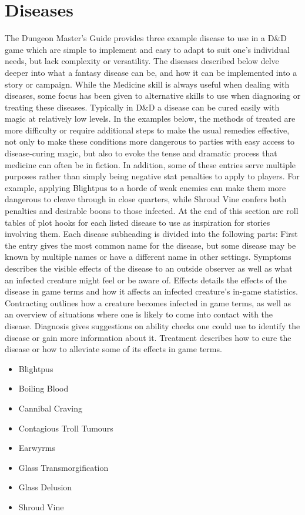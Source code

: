 \documentclass[10pt,a4paper,twoside,twocolumn,openany,bg=print,nodeprecatedcode]{dndbook}
\begin{document}
\tableofcontents
\newpage
\chapter{Diseases}
The Dungeon Master's Guide provides three example disease to use in a D\&D game which are simple to implement and easy to adapt to suit one's individual needs, but lack complexity or versatility. The diseases described below delve deeper into what a fantasy disease can be, and how it can be implemented into a story or campaign.
While the Medicine skill is always useful when dealing with diseases, some focus has been given to alternative skills to use when diagnosing or treating these diseases. Typically in D\&D a disease can be cured easily with magic at relatively low levels. In the examples below, the methods of treated are more difficulty or require additional steps to make the usual remedies effective, not only to make these conditions more dangerous to parties with easy access to disease-curing magic, but also to evoke the tense and dramatic process that medicine can often be in fiction.
In addition, some of these entries serve multiple purposes rather than simply being negative stat penalties to apply to players. For example, applying Blightpus to a horde of weak enemies can make them more dangerous to cleave through in close quarters, while Shroud Vine confers both penalties and desirable boons to those infected. At the end of this section are roll tables of plot hooks for each listed disease to use as inspiration for stories involving them.
 Each disease subheading is divided into the following parts:
 First the entry gives the most common name for the disease, but some disease may be known by multiple names or have a different name in other settings.
 Symptoms describes the visible effects of the disease to an outside observer as well as what an infected creature might feel or be aware of.
 Effects details the effects of the disease in game terms and how it affects an infected creature's in-game statistics.
 Contracting outlines how a creature becomes infected in game terms, as well as an overview of situations where one is likely to come into contact with the disease.
 Diagnosis gives suggestions on ability checks one could use to identify the disease or gain more information about it.
 Treatment describes how to cure the disease or how to alleviate some of its effects in game terms.

\begin{itemize}
\item Blightpus
\item Boiling Blood
\item Cannibal Craving
\item Contagious Troll Tumours
\item Earwyrms
\item Glass Transmorgification
\item Glass Delusion
\item Shroud Vine
\end{itemize}
\end{document}

